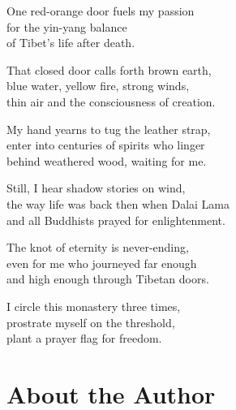 \documentclass[twoside,10pt]{book}
\begin{document}
One red-orange door fuels my passion\\
for the yin-yang balance\\
of Tibet's life after death.

That closed door calls forth brown earth,\\
blue water, yellow fire, strong winds,\\
thin air and the consciousness of creation.

My hand yearns to tug the leather strap,\\
enter into centuries of spirits who linger\\
behind weathered wood, waiting for me.

Still, I hear shadow stories on wind,\\
the way life was back then when Dalai Lama\\
and all Buddhists prayed for enlightenment.

The knot of eternity is never-ending,\\
even for me who journeyed far enough\\
and high enough through Tibetan doors.

I circle this monastery three times,\\
prostrate myself on the threshold,\\
plant a prayer flag for freedom.


\cleardoublepage
\section{About the Author}

\clearpage

\mbox{ }
\end{document}
